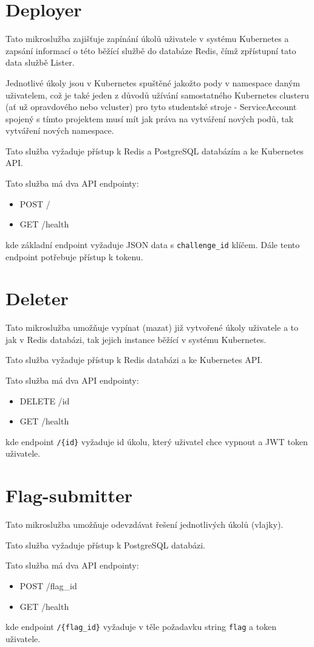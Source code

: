 \documentclass[12pt, a4paper,
twoside,        %
openright
]{report}
\begin{document}
\section{Deployer}
Tato mikroslužba zajišťuje zapínání úkolů uživatele v systému Kubernetes a zapsání informací o této běžící službě do databáze Redis, čímž zpřístupní tato data službě Lister.

Jednotlivé úkoly jsou v Kubernetes spuštěné jakožto pody v namespace daným uživatelem, což je také jeden z důvodů užívání samostatného Kubernetes clusteru (ať už opravdového nebo vcluster) pro tyto studentské stroje - ServiceAccount  spojený s tímto projektem musí mít jak práva na vytváření nových podů, tak vytváření nových namespace.

Tato služba vyžaduje přístup k Redis a PostgreSQL databázím a ke Kubernetes API.

Tato služba má dva API endpointy:
\begin{itemize}
	\item POST /
	\item GET /health
\end{itemize}
kde základní endpoint vyžaduje JSON data s \texttt{challenge\_id} klíčem. Dále tento endpoint potřebuje přístup k tokenu.

\section{Deleter}
Tato mikroslužba umožňuje vypínat (mazat) již vytvořené úkoly uživatele a to jak v Redis databázi, tak jejich instance běžící v systému Kubernetes.

Tato služba vyžaduje přístup k Redis databázi a ke Kubernetes API.

Tato služba má dva API endpointy:
\begin{itemize}
	\item DELETE /{id}
	\item GET /health
\end{itemize}
kde endpoint \texttt{/\{id\}} vyžaduje id úkolu, který uživatel chce vypnout a JWT token uživatele.

\section{Flag-submitter}
Tato mikroslužba umožňuje odevzdávat řešení jednotlivých úkolů (vlajky).

Tato služba vyžaduje přístup k PostgreSQL databázi.

Tato služba má dva API endpointy:
\begin{itemize}
	\item POST /{flag\_id}
	\item GET /health
\end{itemize}
kde endpoint \texttt{/\{flag\_id\}} vyžaduje v těle požadavku string \texttt{flag} a token uživatele.
\end{document}
